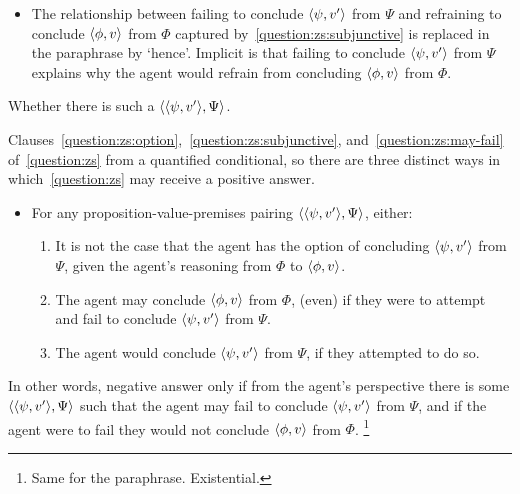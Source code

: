 \begin{note}
\begin{itemize}
    In~\autoref{question:zs}, ensuring that the antecedent of the `would' conditional is always interpreted relative to the agent's present epistemic state.%
    \footnote{
      Basic understanding of subjunctive conditionals: Lewis, Stalnaker, Veltman, etc.
    }
    In the paraphrase the three clauses are combined into a single statement with an implicit temporal ordering, so the relevant subjunctive antecedents are already in place.%
    \footnote{
      Possible to omit \ref{question:zs:option} if rewrite \ref{question:zs:subjunctive}.
    }

  \item
    The relationship between failing to conclude \(\langle \psi, v' \rangle\) from \(\Psi\) and refraining to conclude \(\langle \phi, v \rangle\) from \(\Phi\) captured by~\ref{question:zs:subjunctive} is replaced in the paraphrase by `hence'.
    Implicit is that failing to conclude \(\langle \psi, v' \rangle\) from \(\Psi\) explains why the agent would refrain from concluding \(\langle \phi, v \rangle\) from \(\Phi\).

  \end{itemize}
\end{note}

\begin{note}
  Whether there is such a \(\langle \langle \psi, v' \rangle, \Psi \rangle\).

  Clauses~\ref{question:zs:option},~\ref{question:zs:subjunctive}, and~\ref{question:zs:may-fail} of~\autoref{question:zs} from a quantified conditional, so there are three distinct ways in which~\ref{question:zs} may receive a positive answer.
  \begin{itemize}
  \item
    For any proposition-value-premises pairing \(\langle \langle \psi, v' \rangle, \Psi \rangle\), either:
    \begin{enumerate}[label=\alph*\('\).]
    \item
      It is not the case that the agent has the option of concluding \(\langle \psi, v' \rangle\) from \(\Psi\), given the agent's reasoning from \(\Phi\) to \(\langle \phi, v \rangle\).
    \item
      The agent may conclude \(\langle \phi, v \rangle\) from \(\Phi\), (even) if they were to attempt and fail to conclude \(\langle \psi, v' \rangle\) from \(\Psi\).
    \item
      The agent would conclude \(\langle \psi, v' \rangle\) from \(\Psi\), if they attempted to do so.
    \end{enumerate}
  \end{itemize}

  In other words, negative answer only if from the agent's perspective there is some \(\langle \langle \psi, v' \rangle, \Psi \rangle\) such that the agent may fail to conclude \(\langle \psi, v' \rangle\) from \(\Psi\), and if the agent were to fail they would not conclude \(\langle \phi, v \rangle\) from \(\Phi\).%
  \footnote{
    Same for the paraphrase.
    Existential.
  }
\end{note}


